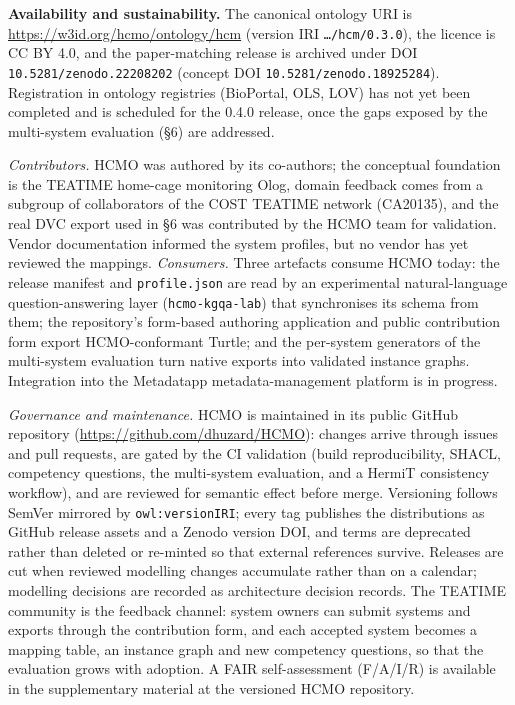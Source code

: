 \textbf{Availability and sustainability.} The canonical ontology URI is \url{https://w3id.org/hcmo/ontology/hcm} (version IRI \nolinkurl{…/hcm/0.3.0}), the licence is CC BY 4.0, and the paper-matching release is archived under DOI \nolinkurl{10.5281/zenodo.22208202} (concept DOI \nolinkurl{10.5281/zenodo.18925284}). Registration in ontology registries (BioPortal, OLS, LOV) has not yet been completed and is scheduled for the 0.4.0 release, once the gaps exposed by the multi-system evaluation (\S{}6) are addressed. 

\emph{Contributors.} HCMO was authored by its co-authors; the conceptual foundation is the TEATIME home-cage monitoring Olog, domain feedback comes from a subgroup of collaborators of the COST TEATIME network (CA20135), and the real DVC export used in \S{}6 was contributed by the HCMO team for validation. Vendor documentation informed the system profiles, but no vendor has yet reviewed the mappings. \emph{Consumers.} Three artefacts consume HCMO today: the release manifest and \nolinkurl{profile.json} are read by an experimental natural-language question-answering layer (\nolinkurl{hcmo-kgqa-lab}) that synchronises its schema from them; the repository's form-based authoring application and public contribution form export HCMO-conformant Turtle; and the per-system generators of the multi-system evaluation turn native exports into validated instance graphs. Integration into the Metadatapp metadata-management platform is in progress. 

\emph{Governance and maintenance.} HCMO is maintained in its public GitHub repository (\url{https://github.com/dhuzard/HCMO}): changes arrive through issues and pull requests, are gated by the CI validation (build reproducibility, SHACL, competency questions, the multi-system evaluation, and a HermiT consistency workflow), and are reviewed for semantic effect before merge. Versioning follows SemVer mirrored by \nolinkurl{owl:versionIRI}; every tag publishes the distributions as GitHub release assets and a Zenodo version DOI, and terms are deprecated rather than deleted or re-minted so that external references survive. Releases are cut when reviewed modelling changes accumulate rather than on a calendar; modelling decisions are recorded as architecture decision records. The TEATIME community is the feedback channel: system owners can submit systems and exports through the contribution form, and each accepted system becomes a mapping table, an instance graph and new competency questions, so that the evaluation grows with adoption. A FAIR self-assessment (F/A/I/R) is available in the supplementary material at the versioned HCMO repository.


